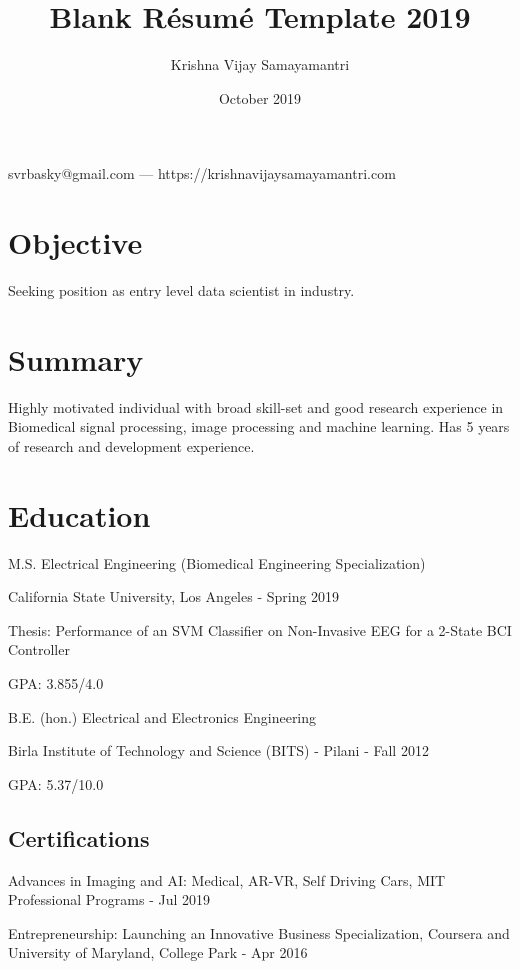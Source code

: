 \documentclass{article}
\makeatletter
\renewcommand{\maketitle}{
\begin{center}
    {\huge\bfseries
    \theauthor}
    
    \vspace{.25em}
    
    svrbasky@gmail.com --- https://krishnavijaysamayamantri.com
    
\end{center}
}
\makeatother
\begin{document}
\title{Blank R\'esum\'e Template 2019}
\author{Krishna Vijay Samayamantri}
\date{October 2019}
\maketitle


\section{Objective}
Seeking position as entry level data scientist in industry.

\section{Summary}
Highly motivated individual with broad skill-set and good research experience in Biomedical signal processing, image processing and machine learning. Has 5 years of research and development experience.

\section{Education}
M.S. Electrical Engineering (Biomedical Engineering Specialization)
    
California State University, Los Angeles - Spring 2019
    
Thesis: Performance of an SVM Classifier on Non-Invasive EEG for a 2-State BCI Controller 
    
GPA: 3.855/4.0
    
B.E. (hon.) Electrical and Electronics Engineering
    
Birla Institute of Technology and Science (BITS) - Pilani - Fall 2012
    
GPA: 5.37/10.0


\subsection{Certifications}
Advances in Imaging and AI: Medical, AR-VR, Self Driving Cars, MIT Professional Programs - Jul 2019

Entrepreneurship: Launching an Innovative Business Specialization, Coursera and University of Maryland, College Park - Apr 2016
\end{document}

